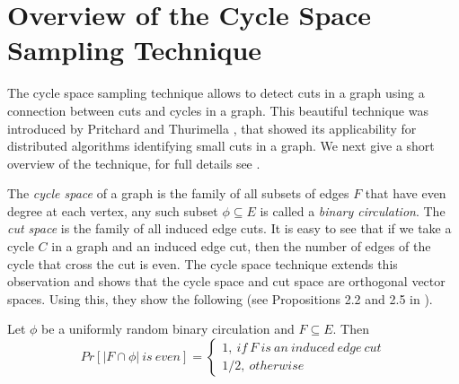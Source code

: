 \section{Overview of the Cycle Space Sampling Technique} \label{sec:cycle_space_overview}

The cycle space sampling technique allows to detect cuts in a graph using a connection between cuts and cycles in a graph.
This beautiful technique was introduced by Pritchard and Thurimella \cite{pritchard2011fast}, that showed its applicability for distributed algorithms identifying small cuts in a graph. We next give a short overview of the technique, for full details see \cite{pritchard2011fast}.

The \emph{cycle space} of a graph is the family of all subsets of edges $F$ that have even degree at each vertex, any such subset $\phi \subseteq E$ is called a \emph{binary circulation}. The \emph{cut space} is the family of all induced edge cuts. It is easy to see that if we take a cycle $C$ in a graph and an induced edge cut, then the number of edges of the cycle that cross the cut is even. The cycle space technique extends this observation and shows that the cycle space and cut space are orthogonal vector spaces. Using this, they show the following (see Propositions 2.2 and 2.5 in \cite{pritchard2011fast}).

\begin{claim} \label{claim_cycle} 
Let $\phi$ be a uniformly random binary circulation and $F \subseteq E$. Then
$$Pr[|F \cap \phi| \ is \ even] = \left\{
                \begin{array}{ll}
                  1,\ if\ F\ is\ an\ induced\ edge\ cut\\
                  1/2,\ otherwise
                \end{array}
              \right. $$ 
\end{claim}   

